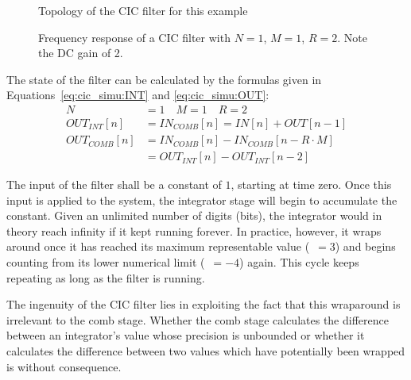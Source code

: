 \begin{figure}
    \centering
    
    \caption[Topology of Example Filter]{Topology of the CIC filter for this example}
    \label{fig:cic_simu:topo}
\end{figure}

\begin{figure}
    \centering
    
    \caption[Frequency Respose of Example CIC Filter]{%
        Frequency response of a CIC  filter with $N=1$, $M=1$, $R=2$. Note the
        DC gain of \num{2}.%
    }
    \label{fig:cic_simu:freqz}
\end{figure}

The  state  of  the  filter  can  be  calculated  by  the  formulas  given  in
Equations~\ref{eq:cic_simu:INT} and \ref{eq:cic_simu:OUT}:
\begin{align}
    N             & = 1 \quad M = 1 \quad R=2\nonumber\\
    OUT_{INT}[n]  & = IN_{COMB}[n] = IN[n]        + OUT[n-1]
    \label{eq:cic_simu:INT} \\
    OUT_{COMB}[n] & = IN_{COMB}[n] - IN_{COMB}[n-R\cdot M]
    \nonumber\\
                  & = OUT_{INT}[n] - OUT_{INT}[n-2]
    \label{eq:cic_simu:OUT}
\end{align}

The  input  of the  filter  shall  be a  constant  of  $1$, starting  at  time
zero. Once this  input is  applied to  the system,  the integrator  stage will
begin  to  accumulate  the  constant. Given  an  unlimited  number  of  digits
(bits),  the integrator  would in  theory reach  infinity if  it kept  running
forever. In practice, however, it wraps around once it has reached its maximum
representable value  (~$ =  3$) and begins  counting from  its lower
numerical limit  (~$=-4$) again. This cycle keeps  repeating as long
as the filter is running.

The  ingenuity of  the  CIC filter  lies  in exploiting  the  fact that  this
wraparound is irrelevant to the  comb stage. Whether the comb stage calculates
the difference between  an integrator's value whose precision  is unbounded or
whether it calculates the difference between two values which have potentially
been  wrapped  is  without  consequence.

